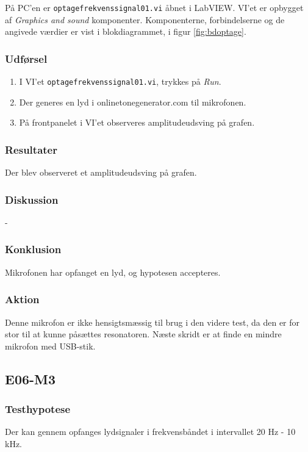 			På PC'en er \texttt{optagefrekvenssignal01.vi} åbnet i LabVIEW. VI'et er opbygget af \textit{Graphics and sound} komponenter. Komponenterne, forbindelserne og de angivede værdier er vist i blokdiagrammet, i figur \ref{fig:bdoptage}.   \\ 
			 
		\subsubsection{Udførsel}
			\begin{enumerate}
				\item I VI'et \texttt{optagefrekvenssignal01.vi}, trykkes på \textit{Run}.  
				\item Der generes en lyd i onlinetonegenerator.com til mikrofonen. 
				\item På frontpanelet i VI'et observeres amplitudeudsving på grafen.  
			\end{enumerate}
		
		\subsubsection{Resultater}
		Der blev observeret et amplitudeudsving på grafen. 
		\subsubsection{Diskussion} 
		-
		\subsubsection{Konklusion}
		Mikrofonen har opfanget en lyd, og hypotesen accepteres. 
		
		\subsubsection{Aktion}
		Denne mikrofon er ikke hensigtsmæssig til brug i den videre test, da den er for stor til at kunne påsættes resonatoren. Næste skridt er at finde en mindre mikrofon med USB-stik. 
		
\subsection{E06-M3}
\label{subsec:E06}
		\subsubsection{Testhypotese}
		Der kan gennem \elektret{} opfanges lydsignaler i frekvensbåndet i intervallet 20 Hz - 10 kHz.
	
